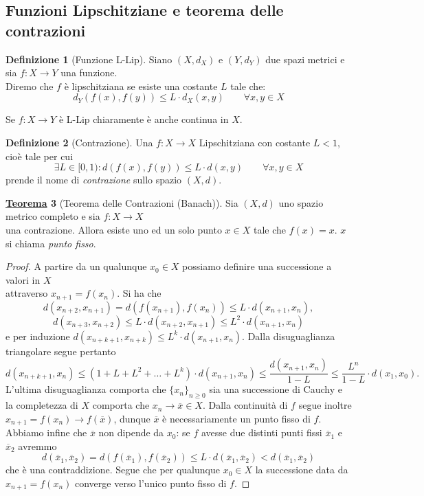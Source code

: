 \documentclass[a4paper,twoside]{article}
\theoremstyle{definition}
\newtheorem{theorem}{\color{Red}\underline{\textrm Teorema}}
\newtheorem{definizione}[theorem]{Definizione}
\numberwithin{theorem}{section}
\begin{document}
\subsection{Funzioni Lipschitziane e teorema delle contrazioni}
\begin{definizione}[Funzione L-Lip]
Siano $(X,d_X)$ e $(Y,d_Y)$ due spazi metrici e sia $f:X\to Y$ una funzione.\\ Diremo che $f$ è lipschitziana se esiste una costante $L$ tale che: $$d_Y(f(x),f(y))\leq L\cdot d_X(x,y)\qquad \forall x,y\in X$$    
\end{definizione}
Se $f:X\to Y$ è L-Lip chiaramente è anche continua in $X$.
\begin{definizione}[Contrazione]
Una $f:X\to X$ Lipschitziana con costante $L<1$, cioè tale per cui
$$\exists L\in[0,1): d(f(x),f(y))\leq L\cdot d(x,y)\qquad\forall x,y\in X$$
prende il nome di \emph{contrazione} sullo spazio $(X,d)$.
\end{definizione}
\begin{theorem}[Teorema delle Contrazioni (Banach)]
Sia $(X,d)$ uno spazio metrico completo e sia $f:X\to X$\\ una contrazione. Allora esiste uno ed un solo punto $x\in X$ tale che $f(x)=x$. $x$ si chiama \emph{punto fisso}.    
\end{theorem}
\begin{proof} A partire da un qualunque $x_0\in X$ possiamo definire una successione a valori in $X$\\ attraverso $x_{n+1}=f(x_n)$. Si ha che 
$$d(x_{n+2},x_{n+1}) = d(f(x_{n+1}),f(x_n)) \leq L\cdot d(x_{n+1},x_n), $$
$$d(x_{n+3},x_{n+2}) \leq L\cdot d(x_{n+2},x_{n+1}) \leq L^2\cdot d(x_{n+1},x_n)$$
e per induzione $d(x_{n+k+1},x_{n+k})\leq L^k\cdot d(x_{n+1},x_{n})$. Dalla disuguaglianza triangolare segue pertanto 
$$ d(x_{n+k+1},x_{n}) \leq \left(1+L+L^2+\ldots+L^k\right)\cdot d(x_{n+1},x_n)\leq \frac{d(x_{n+1},x_n)}{1-L}\leq \frac{L^n}{1-L}\cdot  d(x_1,x_0).$$
L'ultima disuguaglianza comporta che $\{x_n\}_{n\geq 0}$ sia una successione di Cauchy e la completezza di $X$ comporta che $x_n\to \overline{x} \in X$. Dalla continuità di $f$ segue inoltre $x_{n+1}=f(x_n)\to f(\overline{x})$, dunque $\overline{x}$ è necessariamente un punto fisso di $f$. Abbiamo infine che $\overline{x}$ non dipende da $x_0$: se $f$ avesse due distinti punti fissi $\overline{x}_1$ e $\overline{x}_2$ avremmo 
$$ d(\overline{x}_1,\overline{x}_2) = d(f(\overline{x}_1),f(\overline{x}_2)) \leq L\cdot d(\overline{x}_1,\overline{x}_2) < d(\overline{x}_1,\overline{x}_2) $$
che è una contraddizione. Segue che per qualunque $x_0\in X$ la successione data da $x_{n+1}=f(x_n)$ converge verso l'unico punto fisso di $f$.   
\end{proof}
\end{document}
